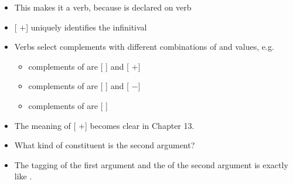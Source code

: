\documentclass[a4paper,landscape,headrule,footrule]{foils}
\begin{document}
\begin{center}
\end{center}

\begin{itemize}\addtolength{\itemsep}{-1ex}
\item This makes it a verb, because  is declared on verb
\item {[  $+$]} uniquely identifies the infinitival 
\item Verbs select complements with different combinations 
  of  and  values, e.g.
  \begin{itemize}
  \item complements of  are [ ] and [ $+$]
  \item complements of  are [ ] and [ $-$]
  \item complements of  are [ ]
  \end{itemize}
\item The meaning of [ $+$] becomes clear in Chapter 13.
\end{itemize}

\begin{center}
\end{center}
\begin{itemize}
\item What kind of constituent is the second argument?
\item The tagging of the first argument and the  of the second 
argument is exactly like .
\end{itemize}

\begin{center} \small
\end{center}
\end{document}
